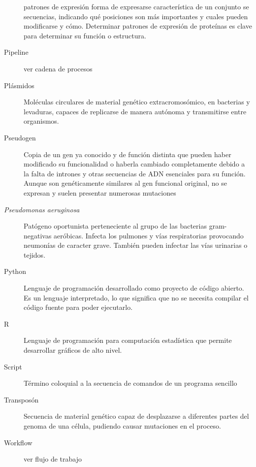 \begin{description}
patrones de expresión forma de expresarse característica de un conjunto se secuencias, indicando qué posiciones son más importantes y cuales pueden modificarse y cómo. Determinar patrones de expresión de proteínas es clave para determinar su función o estructura.
\item[Pipeline] ver cadena de procesos
\item[Plásmidos] Moléculas circulares de material genético extracromosómico, en bacterias y levaduras, capaces de replicarse de manera autónoma y transmitirse entre organismos.
\item[Pseudogen] Copia de un gen ya conocido y de función distinta que pueden haber modificado su funcionalidad o haberla cambiado completamente debido a la falta de intrones y otras secuencias de ADN esenciales para su función. Aunque son genéticamente similares al gen funcional original, no se expresan y suelen presentar numerosas mutaciones 
\item[\textit{Pseudomonas aeruginosa}]  Patógeno oportunista perteneciente al grupo de las bacterias gram-negativas aeróbicas. Infecta los pulmones y vías respiratorias provocando neumonías de caracter grave. También pueden infectar las vías urinarias o tejidos.
\item[Python] Lenguaje  de  programación  desarrollado  como  proyecto  de  código  abierto. Es  un  lenguaje interpretado,  lo  que  significa  que  no  se  necesita  compilar  el  código  fuente  para  poder  ejecutarlo.
\item[R] Lenguaje de programación para computación estadística que permite desarrollar gráficos de alto nivel.
\item[Script] Término coloquial a la secuencia de comandos de un programa sencillo
\item[Transposón] Secuencia de material genético capaz de desplazarse a diferentes partes del genoma de una célula, pudiendo causar mutaciones en el proceso.
\item[Workflow] ver flujo de trabajo


\end{description}

